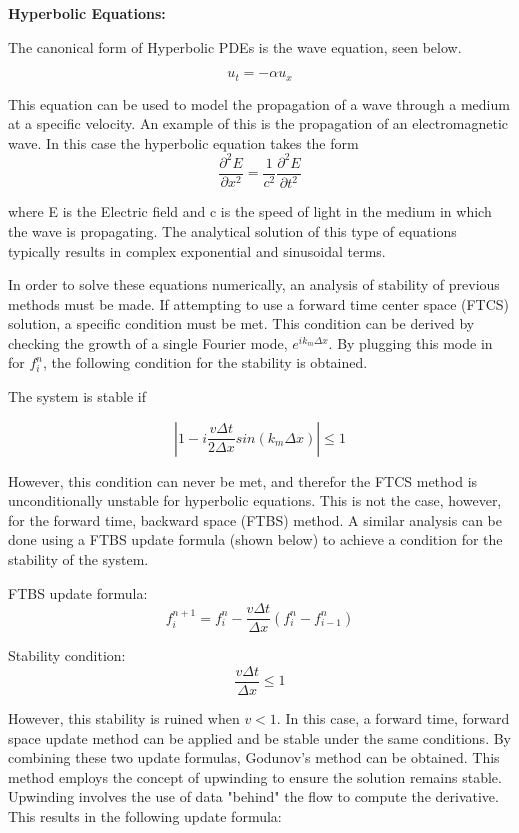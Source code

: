 \documentclass{article}
\begin{document}
      \textbf{Hyperbolic Equations:}
      
      The canonical form of Hyperbolic PDEs is the wave equation, seen below.
      
      \begin{equation}
      u_{t} = -\alpha u_{x}
      \end{equation}
      
      This equation can be used to model the propagation of a wave through a medium at a specific velocity. An example of this is the propagation of an electromagnetic wave. In this case the hyperbolic equation takes the form 
      $$ \frac{\partial^2 E}{\partial x^2} = \frac{1}{c^2} \frac{\partial^2 E}{\partial t^2} $$
      
      where E is the Electric field and c is the speed of light in the medium in which the wave is propagating. The analytical solution of this type of equations typically results in complex exponential and sinusoidal terms.
      
      In order to solve these equations numerically, an analysis of stability of previous methods must be made. If attempting to use a forward time center space (FTCS) solution, a specific condition must be met. This condition can be derived by checking the growth of a single Fourier mode, $e^{ik_m\Delta x}$. By plugging this mode in for $f^{n}_{i}$, the following condition for the stability is obtained. 
      
      The system is stable if
      
      $$\left|1-i\frac{v\Delta t}{2\Delta x}sin(k_m\Delta x)\right| \le 1$$
      
      However, this condition can never be met, and therefor the FTCS method is unconditionally unstable for hyperbolic equations. This is not the case, however, for the forward time, backward space (FTBS) method. A similar analysis can be done using a FTBS update formula (shown below) to achieve a condition for the stability of the system. 
      
      FTBS update formula:
      $$ f^{n+1}_{i} = f^{n}_{i} - \frac{v\Delta t}{\Delta x}\left(f^{n}_{i} - f^{n}_{i-1}\right)$$
      
      Stability condition:
      $$\frac{v\Delta t}{\Delta x} \le 1$$
      
      However, this stability is ruined when $v < 1$. In this case, a forward time, forward space update method can be applied and be stable under the same conditions. By combining these two update formulas, Godunov's method can be obtained. This method employs the concept of upwinding to ensure the solution remains stable. Upwinding involves the use of data "behind" the flow to compute the derivative. This results in the following update formula:
      
\end{document}
